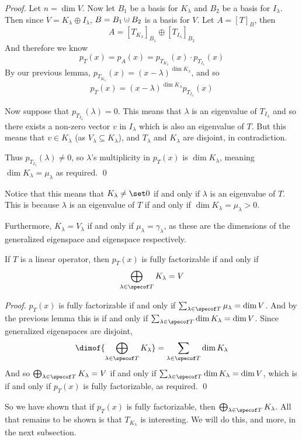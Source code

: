 \begin{proof}

    Let $n=\dim V$.
    Now let $B_1$ be a basis for $K_\lambda$ and $B_2$ be a basis for $I_\lambda$.
    Then since $V=K_\lambda\oplus I_\lambda$, $B=B_1\dcup B_2$ is a basis for $V$.
    Let $A=[T]_B$, then
    \[ A = [T_{K_\lambda}]_{B_1}\oplus[T_{I_\lambda}]_{B_2} \]
    And therefore we know
    \[ p_T(x) = p_A(x) = p_{T_{K_\lambda}}(x)\cdot p_{T_{I_\lambda}}(x) \]
    By our previous lemma, $p_{T_{K_\lambda}}(x)=(x-\lambda)^{\dim K_\lambda}$, and so
    \[ p_T(x) = (x-\lambda)^{\dim K_\lambda} p_{T_{I_\lambda}}(x) \]

    Now suppose that $p_{T_{I_\lambda}}(\lambda)=0$.
    This means that $\lambda$ is an eigenvalue of $T_{I_\lambda}$ and so there exists a non-zero vector $v$ in $I_\lambda$ which is also an eigenvalue of $T$.
    But this means that $v\in K_\lambda$ (as $V_\lambda\subseteq K_\lambda$), and $T_\lambda$ and $K_\lambda$ are disjoint, in contradiction.

    Thus $p_{T_{I_\lambda}}(\lambda)\neq0$, so $\lambda$'s multiplicity in $p_T(x)$ is $\dim K_\lambda$, meaning $\dim K_\lambda=\mu_\lambda$ as required.
    \qed

\end{proof}

Notice that this means that $K_\lambda\neq\set0$ if and only if $\lambda$ is an eigenvalue of $T$.
This is because $\lambda$ is an eigenvalue of $T$ if and only if $\dim K_\lambda=\mu_\lambda>0$.

Furthermore, $K_\lambda=V_\lambda$ if and only if $\mu_\lambda=\gamma_\lambda$, as these are the dimensions of the generalized eigenspace and eigenspace respectively.

\begin{thrm*}

    If $T$ is a linear operator, then $p_T(x)$ is fully factorizable if and only if
    \[ \bigoplus_{\lambda\in\specof T}K_\lambda = V \]

\end{thrm*}

\begin{proof}

    $p_T(x)$ is fully factorizable if and only if $\sum_{\lambda\in\specof T}\mu_\lambda=\dim V$.
    And by the previous lemma this is if and only if $\sum_{\lambda\in\specof T}\dim K_\lambda=\dim V$.
    Since generalized eigenspaces are disjoint, 
    \[ \dimof{\bigoplus_{\lambda\in\specof T}K_\lambda} = \sum_{\lambda\in\specof T}\dim K_\lambda \]
    And so $\bigoplus_{\lambda\in\specof T}K_\lambda=V$ if and only if $\sum_{\lambda\in\specof T}\dim K_\lambda=\dim V$, which is if and only if $p_T(x)$ is fully factorizable, as required.
    \qed

\end{proof}

So we have shown that if $p_T(x)$ is fully factorizable, then $\bigoplus_{\lambda\in\specof T}K_\lambda$.
All that remains to be shown is that $T_{K_\lambda}$ is interesting.
We will do this, and more, in the next subsection.


